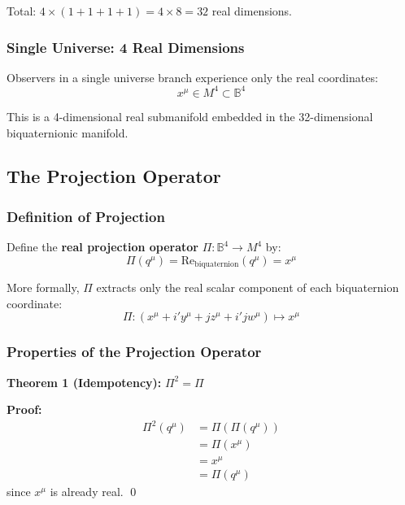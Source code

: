 Total: $4 \times (1 + 1 + 1 + 1) = 4 \times 8 = 32$ real dimensions.

\subsubsection{Single Universe: 4 Real Dimensions}

Observers in a single universe branch experience only the real coordinates:
\begin{equation}
x^{\mu} \in M^4 \subset \mathbb{B}^4
\end{equation}

This is a 4-dimensional real submanifold embedded in the 32-dimensional biquaternionic manifold.

\subsection{The Projection Operator}

\subsubsection{Definition of Projection}

Define the \textbf{real projection operator} $\Pi: \mathbb{B}^4 \to M^4$ by:
\begin{equation}
\Pi(q^{\mu}) = \text{Re}_{\text{biquaternion}}(q^{\mu}) = x^{\mu}
\label{eq:projection_operator}
\end{equation}

More formally, $\Pi$ extracts only the real scalar component of each biquaternion coordinate:
\begin{equation}
\Pi: (x^{\mu} + i' y^{\mu} + j z^{\mu} + i'j w^{\mu}) \mapsto x^{\mu}
\end{equation}

\subsubsection{Properties of the Projection Operator}

\textbf{Theorem 1 (Idempotency):} $\Pi^2 = \Pi$

\textbf{Proof:} 
\begin{align}
\Pi^2(q^{\mu}) &= \Pi(\Pi(q^{\mu})) \\
&= \Pi(x^{\mu}) \\
&= x^{\mu} \\
&= \Pi(q^{\mu})
\end{align}
since $x^{\mu}$ is already real. \qed

